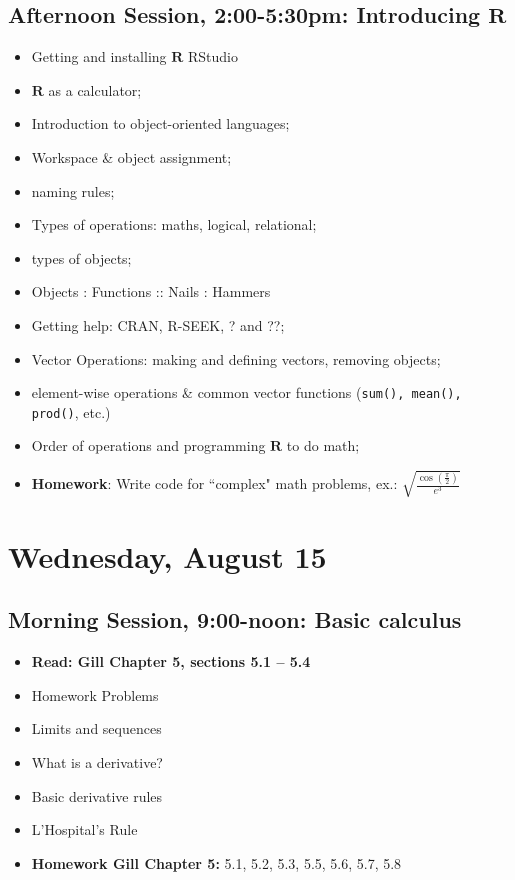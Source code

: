 \documentclass[12pt,a4paper]{article}
\begin{document}
\subsection*{Afternoon Session, 2:00-5:30pm: Introducing $\mathbf{R}$}
\begin{itemize}
\setlength{\itemsep}{0pt}
\footnotesize
\item Getting and installing $\mathbf{R}$ RStudio
\item $\mathbf{R}$ as a calculator;
\item Introduction to object-oriented languages;
\item Workspace \& object assignment;
\item naming rules;
\item Types of operations: maths, logical, relational;
\item types of objects;
\item Objects : Functions :: Nails : Hammers
\item Getting help: CRAN, R-SEEK, ? and ??;
\item Vector Operations: making and defining vectors, removing objects;
\item element-wise operations \& common vector functions (\texttt{sum(), mean(), prod()}, etc.)
\item Order of operations and programming $\mathbf{R}$ to do math;
\item \textbf{Homework}: Write code for ``complex" math problems, ex.: $\sqrt{\frac{\cos(\frac{\pi}{2})}{e^{3}}}$
\end{itemize}


\section*{Wednesday, August 15}
\subsection*{Morning Session, 9:00-noon: Basic calculus}
\begin{itemize}
\setlength{\itemsep}{0pt}
\footnotesize
\item \textbf{Read: Gill Chapter 5, sections 5.1 -- 5.4}
\item Homework Problems
\item Limits and sequences
\item What is a derivative?
\item Basic derivative rules
\item L'Hospital's Rule
\item \textbf{Homework Gill Chapter 5:} 5.1, 5.2, 5.3, 5.5, 5.6, 5.7, 5.8
\end{itemize}
\end{document}
